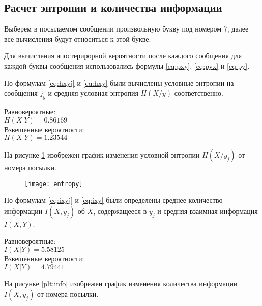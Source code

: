 \subsection{Расчет энтропии и количества информации}

Выберем в посылаемом сообщении произвольную букву под номером 7, далее все вычисления будут относиться к этой букве.

Для вычисления апостерирорной вероятности после каждого сообщения для каждой буквы сообщения использовались формулы \ref{eq:pxy}, \ref{eq:pyx} и \ref{eq:py}.

По формулам \ref{eq:hxyj} и \ref{eq:hxy} были вычислены условные энтропии на сообщения $j_y$ и средняя условная энтропия $H(X/y)$ соответственно. 

\begin{multicols}{2}
\begin{center}
Равновероятные:\\
$H(X|Y) = 0.86169$\\
Взвешенные вероятности:\\
$H(X|Y) = 1.23544$
\end{center}
\end{multicols}

На рисунке \ref{plt:entropy} изобрежен график изменения условной энтропии $H(X/y_j)$ от номера посылки.

\begin{figure}[H]
\begin{center}
	\vspace{-0.5cm}
	\texttt{[image: entropy]}
	\caption{}
	\label{plt:entropy}
	\vspace{-0.5cm}
\end{center}
\end{figure}

По формулам \ref{eq:ixyj} и \ref{eq:ixy} были определены среднее количество информации $I(X, y_j)$ об $X$, содержащееся в $y_j$ и средняя взаимная информация $I(X, Y)$.

\begin{multicols}{2}
\begin{center}
Равновероятные:\\
$I(X|Y) = 5.58125$\\
Взвешенные вероятности:\\
$I(X|Y) = 4.79441$
\end{center}
\end{multicols}

На рисунке \ref{plt:info} изобрежен график изменения количества
информации $I(X, y_j)$ от номера посылки.

